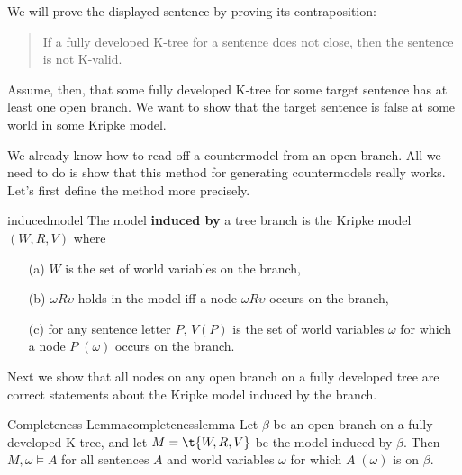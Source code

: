 We will prove the displayed sentence by proving its contraposition:
\begin{quote}
  If a fully developed K-tree for a sentence does not close, then the sentence is
  not K-valid.
\end{quote}
Assume, then, that some fully developed K-tree for some target sentence has at
least one open branch. We want to show that the target sentence is false at some
world in some Kripke model.

We already know how to read off a countermodel from an open branch. All we need
to do is show that this method for generating countermodels really works. Let's
first define the method more precisely.

\begin{definition}{}{inducedmodel}
  The model \textbf{induced by} a tree branch is the Kripke model $(W,R,V)$
  where
  \begin{itemize}[leftmargin=12mm]
    \itemsep-1mm
    \item[(a)] $W$ is the set of world variables on the branch,
    \item[(b)] $\omega R \upsilon$ holds in the model iff a node
          $\omega R \upsilon$ occurs on the branch,
    \item[(c)] for any sentence letter $P$, $V(P)$ is the set of world variables
          $\omega$ for which a node $P \; (\omega)$ occurs on the branch.
  \end{itemize}
\end{definition}

Next we show that all nodes on any open branch on a fully developed tree are
correct statements about the Kripke model induced by the branch.

\begin{theorem}{Completeness Lemma}{completenesslemma}
  Let $\beta$ be an open branch on a fully developed K-tree, and let
  $M = \t{W,R,V}$ be the model induced by $\beta$. Then $M,\omega \models A$ for
  all sentences $A$ and world variables $\omega$ for which $A\; (\omega)$ is on
  $\beta$.
\end{theorem}

